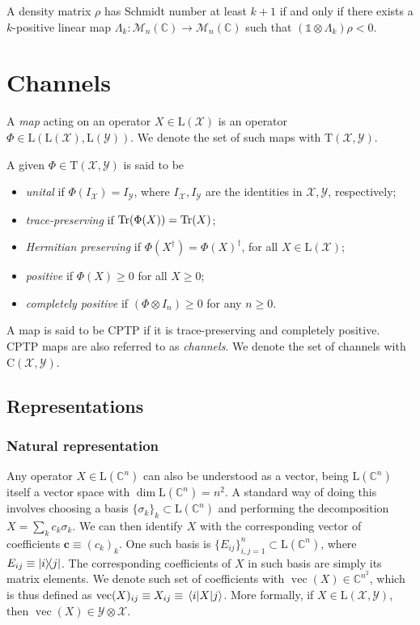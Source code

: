\documentclass[a4paper]{report}
\newcommand{\CC}{\mathbb{C}}
\newcommand{\on}[1]{\operatorname{#1}}
\newcommand{\bs}[1]{\boldsymbol{#1}}
\newcommand{\calY}{{\mathcal{Y}}}
\newcommand{\calX}{{\mathcal{X}}}
\newcommand{\rmC}{{\mathrm{C}}}
\newcommand{\rmD}{{\mathrm{D}}}
\newcommand{\rmL}{{\mathrm{L}}}
\newcommand{\rmT}{{\mathrm{T}}}
\begin{document}
\begin{thm}
	A density matrix $\rho$ has Schmidt number at least $k+1$ if and only if there exists a $k$-positive linear map $\Lambda_k: \mathcal M_n(\mathbb C)\rightarrow \mathcal M_n(\mathbb C)$ such that 
	$(\mathds1\otimes \Lambda_k)\rho < 0$.
\end{thm}

\chapter{Channels}
\minitoc

A \emph{map} acting on an operator $X\in\rmL(\calX)$ is an operator $\Phi\in\rmL(\rmL(\calX),\rmL(\calY))$. We denote the set of such maps with $\rmT(\calX,\calY)$.

A given $\Phi\in\rmT(\calX,\calY)$ is said to be
\begin{itemize}
	\item \emph{unital} if $\Phi(I_{\calX})=I_{\calY}$, where $I_{\calX},I_{\calY}$ are the identities in $\calX,\calY$, respectively;
	\item \emph{trace-preserving} if $\Tr(\Phi(X))=\Tr(X)$;
	\item \emph{Hermitian preserving} if $\Phi(X^\dagger)=\Phi(X)^\dagger$, for all $X\in\rmL(\calX)$;
	\item \emph{positive} if $\Phi(X)\ge0$ for all $X\ge0$;
	\item \emph{completely positive} if $(\Phi\otimes I_n)\ge0$ for any $n\ge0$.
\end{itemize}

A map is said to be CPTP if it is trace-preserving and completely positive. CPTP maps are also referred to as \emph{channels}. We denote the set of channels with $\rmC(\calX,\calY)$.


\section{Representations}

\subsection{Natural representation}

Any operator $X\in\rmL(\CC^n)$ can also be understood as a vector, being $\rmL(\CC^n)$ itself a vector space with $\dim\rmL(\CC^n)=n^2$. A standard way of doing this involves choosing a basis $\{\sigma_k\}_k\subset\rmL(\CC^n)$ and performing the decomposition $X=\sum_k c_k\sigma_k$. We can then identify $X$ with the corresponding vector of coefficients $\bs c\equiv (c_k)_k$.
One such basis is $\{E_{ij}\}_{i,j=1}^n\subset\rmL(\CC^n)$, where $E_{ij}\equiv \ketbra{i}{j}$.
The corresponding coefficients of $X$ in such basis are simply its matrix elements. We denote such set of coefficients with $\on{vec}(X)\in\CC^{n^2}$, which is thus defined as
	$\on{vec}(X)_{ij} \equiv X_{ij} \equiv \mel{i}{X}{j}$.
More formally, if $X\in\rmL(\calX,\calY)$, then $\on{vec}(X)\in\calY\otimes\calX$.
\end{document}
